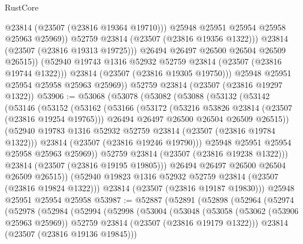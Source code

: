\begin{lexlean}{RustCore}
\begin{coremodule}
                        @23814
                        (@23507 (@23816 @19364 @19710)))
                      @25948
                      @25951
                      @25954
                      @25958
                      @25963
                      @25969))
                  @52759
                  @23814
                  (@23507 (@23816 @19356 @1322)))
                @23814
                (@23507 (@23816 @19313 @19725)))
              @26494
              @26497
              @26500
              @26504
              @26509
              @26515))
          (@52940 @19743 @1316 @52932 @52759 @23814 (@23507 (@23816 @19744 @1322)))
          @23814
          (@23507 (@23816 @19305 @19750)))
        @25948
        @25951
        @25954
        @25958
        @25963
        @25969))
    @52759
    @23814
    (@23507 (@23816 @19297 @1322))
@53906 := @53068
    (@53078
      (@53082
        (@53088
          (@53132
            (@53142
              (@53146
                (@53152
                  (@53162
                    (@53166
                      (@53172
                        (@53216 @53826 @23814 (@23507 (@23816 @19254 @19765)))
                        @26494
                        @26497
                        @26500
                        @26504
                        @26509
                        @26515))
                    (@52940 @19783 @1316 @52932 @52759 @23814 (@23507 (@23816 @19784 @1322)))
                    @23814
                    (@23507 (@23816 @19246 @19790)))
                  @25948
                  @25951
                  @25954
                  @25958
                  @25963
                  @25969))
              @52759
              @23814
              (@23507 (@23816 @19238 @1322)))
            @23814
            (@23507 (@23816 @19195 @19805)))
          @26494
          @26497
          @26500
          @26504
          @26509
          @26515))
      (@52940 @19823 @1316 @52932 @52759 @23814 (@23507 (@23816 @19824 @1322)))
      @23814
      (@23507 (@23816 @19187 @19830)))
    @25948
    @25951
    @25954
    @25958
@53987 := @52887
    (@52891
      (@52898
        (@52964
          (@52974
            (@52978
              (@52984
                (@52994
                  (@52998
                    (@53004
                      (@53048
                        (@53058
                          (@53062 (@53906 @25963 @25969))
                          @52759
                          @23814
                          (@23507 (@23816 @19179 @1322)))
                        @23814
                        (@23507 (@23816 @19136 @19845)))

\end{coremodule}
\end{lexlean}
